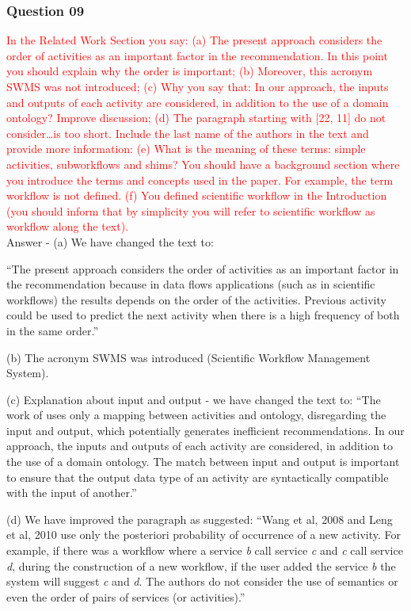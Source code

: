\documentclass{report}
\begin{document}
\subsubsection{Question 09}
\textcolor{red}{In the Related Work Section you say: (a) The present approach considers the
	order of activities as an important factor in the recommendation. In this
	point you should explain why the order is important; (b) Moreover, this acronym
	SWMS was not introduced; (c) Why you say that:  In our approach, the inputs
	and outputs of each activity are considered, in addition to the use of a
	domain ontology? Improve discussion; (d) The paragraph  starting with [22, 11]
	do not consider…is too short. Include the last name of the authors in the
	text and provide more information: (e) What is the meaning of these terms:
	simple activities, subworkflows  and shims? You should have a background
	section where you introduce the terms and concepts used in the paper. For
	example, the term workflow is not defined. (f) You defined scientific workflow
	in the Introduction (you should inform that by simplicity you will refer to
	scientific workflow as workflow along the text).}
\\
Answer - (a) We have changed the text to:

``The present approach considers the order of activities as an important factor in the recommendation because in data flows applications (such as in scientific workflows) the results depends on the order of the activities. Previous activity could be used to predict the next activity when there is a high frequency of both in the same order.''

(b) The acronym SWMS was introduced (Scientific Workflow Management System).

(c) Explanation about input and output - we have changed the text to: ``The work of \cite{Bomfim2005} uses only a mapping between activities and ontology, disregarding the input and output, which potentially generates inefficient recommendations. In our approach, the inputs and outputs of each activity are considered, in addition to the use of a domain ontology. The match between input and output is important to ensure that the output data type of an activity are syntactically compatible with the input of another.''

(d) We have improved the paragraph as suggested: ``Wang et al, 2008\nocite{Wang2008} and Leng et al, 2010\nocite{Leng2010} use only the posteriori probability of occurrence of a new activity. For example, if there was a workflow where a service \emph{b} call service \emph{c} and \emph{c} call service \emph{d}, during the construction of a new workflow, if the user added the service \emph{b} the system will suggest \emph{c} and \emph{d}. The authors do not consider the use of semantics or even the order of pairs of services (or activities).''
\end{document}
